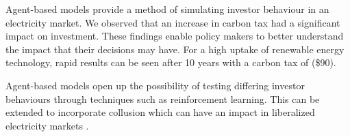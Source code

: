 
Agent-based models provide a method of simulating investor behaviour in an electricity market. We observed that an increase in carbon tax had a significant impact on investment. These findings enable policy makers to better understand the impact that their decisions may have. For a high uptake of renewable energy technology, rapid results can be seen after 10 years with a carbon tax of  (\$90).

Agent-based models open up the possibility of testing differing investor behaviours through techniques such as reinforcement learning. This can be extended to incorporate collusion which can have an impact in liberalized electricity markets \cite{Benjamin2016}.



\FloatBarrier